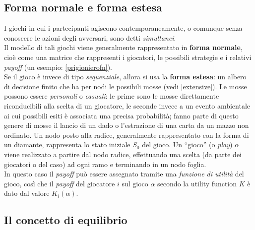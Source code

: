 \subsection{Forma normale e forma estesa}
I giochi in cui i partecipanti agiscono contemporaneamente, o comunque senza conoscere le azioni degli avversari, sono detti \emph{simultanei}.\\
Il modello di tali giochi viene generalmente rappresentato in \textbf{forma normale}, cioè come una matrice che rappresenti i giocatori, le possibili strategie e i relativi \emph{payoff} (un esempio: \ref{prigionierofn}).\\
Se il gioco è invece di tipo \emph{sequenziale}, allora si usa la \textbf{forma estesa}: un albero di decisione finito che ha per nodi le possibili mosse (vedi \ref{extensive}).
Le mosse possono essere \emph{personali} o \emph{casuali}: le prime sono le mosse direttamente riconducibili alla scelta di un giocatore, le seconde invece a un evento ambientale ai cui possibili esiti è associata una precisa probabilità; fanno parte di questo genere di mosse il lancio di un dado o l'estrazione di una carta da un mazzo non ordinato.
Un nodo posto alla radice, generalmente rappresentato con la forma di un diamante, rappresenta lo stato iniziale $S_0$ del gioco.
Un ``gioco'' (o \emph{play}) $\alpha$ viene realizzato a partire dal nodo radice, effettuando una scelta (da parte dei giocatori o del caso) ad ogni ramo e terminando in un nodo foglia.\\
In questo caso il \emph{payoff} può essere assegnato tramite una \emph{funzione di utilità} del gioco, così che il \emph{payoff} del giocatore $i$ sul gioco $\alpha$ secondo la utility function $K$ è dato dal valore $K_i(\alpha)$. \cite{frank}

\subsection{Il concetto di equilibrio}

